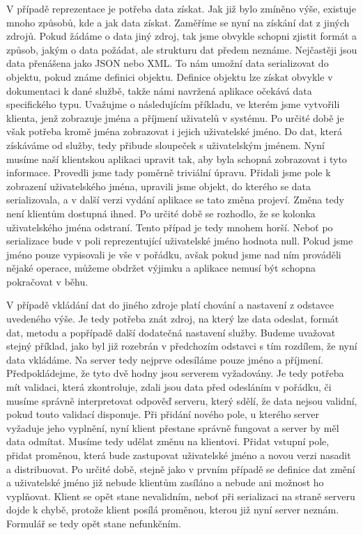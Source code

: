 V případě reprezentace je potřeba data získat. Jak již bylo zmíněno výše, existuje mnoho způsobů, kde a jak data získat. Zaměříme se nyní na získání dat z jiných zdrojů. Pokud žádáme o data jiný zdroj, tak jsme obvykle schopni zjistit formát a způsob, jakým o data požádat, ale strukturu dat předem neznáme. Nejčastěji jsou data přenášena jako JSON \cite{javaEE} nebo XML. To nám umožní data serializovat do objektu, pokud známe definici objektu. Definice objektu lze získat obvykle v dokumentaci k dané službě, takže námi navržená aplikace očekává data specifického typu. Uvažujme o následujícím příkladu, ve kterém jsme vytvořili klienta, jenž zobrazuje jména a příjmení uživatelů v systému. Po určité době je však potřeba kromě jména zobrazovat i jejich uživatelské jméno. Do dat, která získáváme od služby, tedy přibude sloupeček s uživatelským jménem. Nyní musíme naší klientskou aplikaci upravit tak, aby byla schopná zobrazovat i tyto informace. Provedli jsme tady poměrně triviální úpravu. Přidali jsme pole k zobrazení uživatelského jména, upravili jsme objekt, do kterého se data serializovala, a v další verzi vydání aplikace se tato změna projeví. Změna tedy není klientům dostupná ihned. Po určité době se rozhodlo, že se kolonka uživatelského jména odstraní. Tento případ je tedy mnohem horší. Neboť po serializace bude v poli reprezentující uživatelské jméno hodnota null. Pokud jsme jméno pouze vypisovali je vše v pořádku, avšak pokud jsme nad ním prováděli nějaké operace, můžeme obdržet výjimku a aplikace nemusí být schopna pokračovat v běhu.

V případě vkládání dat do jiného zdroje platí chování a nastavení z odstavce uvedeného výše. Je tedy potřeba znát zdroj, na který lze data odeslat, formát dat, metodu a popřípadě další dodatečná nastavení služby. Budeme uvažovat stejný příklad, jako byl již rozebrán v předchozím odstavci s tím rozdílem, že nyní data vkládáme. Na server tedy nejprve odesíláme pouze jméno a příjmení. Předpokládejme, že tyto dvě hodny jsou serverem vyžadovány. Je tedy potřeba mít validaci, která zkontroluje, zdali jsou data před odesláním v pořádku, či musíme správně interpretovat odpověď serveru, který sdělí, že data nejsou validní, pokud touto validací disponuje. Při přidání nového pole, u kterého server vyžaduje jeho vyplnění, nyní klient přestane správně fungovat a server by měl data odmítat. Musíme tedy udělat změnu na klientovi. Přidat vstupní pole, přidat proměnou, která bude zastupovat uživatelské jméno a novou verzi nasadit a distribuovat. Po určité době, stejně jako v prvním případě se definice dat změní a uživatelské jméno již nebude klientům zasíláno a nebude ani možnost ho vyplňovat. Klient se opět stane nevalidním, neboť při serializaci na straně serveru dojde k chybě, protože klient posílá proměnou, kterou již nyní server neznám. Formulář se tedy opět stane nefunkčním.
